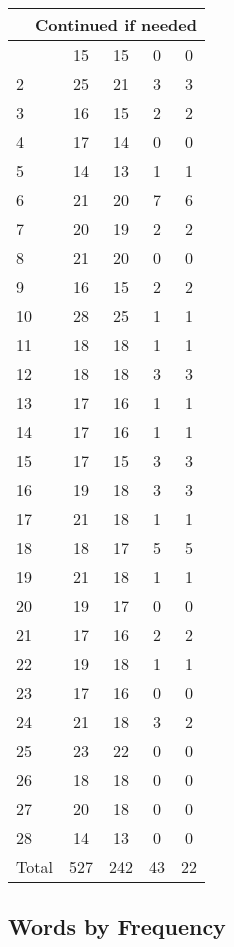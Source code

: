 \begin{center}
\begin{longtable}{l|c|c|c|c}
\hline \multicolumn{5}{|r|}{{Continued if needed}} \\ \hline
\endfoot 
1 & 15 & 15 & 0 & 0\\ \hline
2 & 25 & 21 & 3 & 3\\ \hline
3 & 16 & 15 & 2 & 2\\ \hline
4 & 17 & 14 & 0 & 0\\ \hline
5 & 14 & 13 & 1 & 1\\ \hline
6 & 21 & 20 & 7 & 6\\ \hline
7 & 20 & 19 & 2 & 2\\ \hline
8 & 21 & 20 & 0 & 0\\ \hline
9 & 16 & 15 & 2 & 2\\ \hline
10 & 28 & 25 & 1 & 1\\ \hline
11 & 18 & 18 & 1 & 1\\ \hline
12 & 18 & 18 & 3 & 3\\ \hline
13 & 17 & 16 & 1 & 1\\ \hline
14 & 17 & 16 & 1 & 1\\ \hline
15 & 17 & 15 & 3 & 3\\ \hline
16 & 19 & 18 & 3 & 3\\ \hline
17 & 21 & 18 & 1 & 1\\ \hline
18 & 18 & 17 & 5 & 5\\ \hline
19 & 21 & 18 & 1 & 1\\ \hline
20 & 19 & 17 & 0 & 0\\ \hline
21 & 17 & 16 & 2 & 2\\ \hline
22 & 19 & 18 & 1 & 1\\ \hline
23 & 17 & 16 & 0 & 0\\ \hline
24 & 21 & 18 & 3 & 2\\ \hline
25 & 23 & 22 & 0 & 0\\ \hline
26 & 18 & 18 & 0 & 0\\ \hline
27 & 20 & 18 & 0 & 0\\ \hline
28 & 14 & 13 & 0 & 0\\ \hline
\hline \hline
Total & 527 & 242 & 43 & 22




\end{longtable}
\end{center}



\subsection{Words by Frequency}

